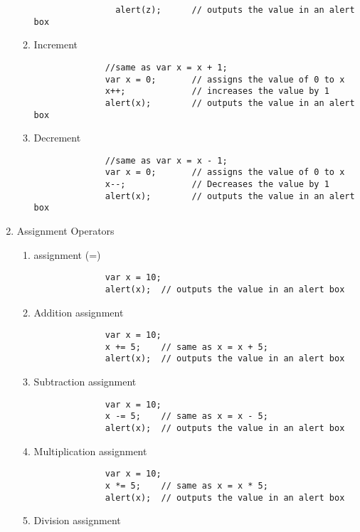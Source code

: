 \documentclass{article}
\begin{document}
\begin{enumerate}
\begin{enumerate}
\begin{lstlisting}
                alert(z);      // outputs the value in an alert box
              \end{lstlisting}
            \item Increment
              \begin{lstlisting}
              //same as var x = x + 1;
              var x = 0;       // assigns the value of 0 to x
              x++;             // increases the value by 1
              alert(x);        // outputs the value in an alert box
              \end{lstlisting}
            \item Decrement
              \begin{lstlisting}
              //same as var x = x - 1;
              var x = 0;       // assigns the value of 0 to x
              x--;             // Decreases the value by 1
              alert(x);        // outputs the value in an alert box
              \end{lstlisting}
          \end{enumerate}
        \item Assignment Operators
        \begin{enumerate}
          \item assignment (=)
            \begin{lstlisting}
              var x = 10;
              alert(x);  // outputs the value in an alert box
            \end{lstlisting}
          \item Addition assignment
            \begin{lstlisting}
              var x = 10;
              x += 5;    // same as x = x + 5;
              alert(x);  // outputs the value in an alert box
            \end{lstlisting}
          \item Subtraction assignment
            \begin{lstlisting}
              var x = 10;
              x -= 5;    // same as x = x - 5;
              alert(x);  // outputs the value in an alert box
            \end{lstlisting}
          \item Multiplication assignment
            \begin{lstlisting}
              var x = 10;
              x *= 5;    // same as x = x * 5;
              alert(x);  // outputs the value in an alert box
            \end{lstlisting}
          \item Division assignment

\end{enumerate}
\end{enumerate}
\end{document}
